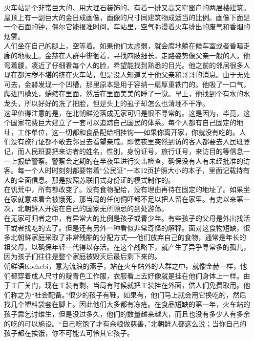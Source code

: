 火车站是个非常巨大的、用大理石装饰的、有着一排又高又窄窗户的两层楼建筑。屋顶上有一副巨大的金日成画像，画像的尺寸同建筑物成适当的比例。画像下面是一个石面的钟，偶尔它能报准时间。车站里，空气弥漫着火车排出的废气和香烟的烟雾。\\

人们坐在自己的腿上，空等着。如果他们太虚弱，就会席地躺在候车室或者昏暗走廊的地板上。金赫在人群中徘徊着，寻找四肢细长，走路姿势像父亲一般的人。他弯着腰，凑近了仔细看每个人的脸，希望能找到熟悉的目光。他之前的邻居很多人现在都污秽不堪的挤在火车站，但是没人知道关于他父亲和哥哥的消息。由于无处可去，金赫发现一个凹槽，那里原本是用于容纳一扇厚重铁门的。他吸了一口气，爬进凹槽处，蜷缩在里面，然后在里面美美的睡了一觉。早上，他找到个有水的水龙头，所以好好的洗了把脸，但是头上的虱子却怎么也清理不干净。\\

这里值得注意的是，在北朝鲜沦落成无家可归是很不寻常的。这是因为，毕竟，这个国家花费巨大建立了一套可以追踪自己国民的体系。每个人都有自己固定的地址，工作单位，这一切都和食品配给相挂钩──如果你离开家，你就没有吃的。人们没有旅行证都不敢去邻县去看望亲戚。即使夜里突然到访的客人都要去人民班登记，而人民班要把来访者的姓名，性别，身份证号，旅行证号，来访目的等信息一一上报给警察。警察会定期的在半夜里进行突击检查，确保没有人有未经批准的访客。每一个人时时刻刻都要带着“公民证”一本12页护照大小的本子，里面记载持有人的全面信息。那是按照苏联旧式身份证的模式制作的。\\

在饥荒中，所有都改变了。没有食物配给，没有理由再待在固定的地址了。如果坐在家就意味着会被饿死，那当局的任何恫吓都不足以把人留在家里。有史以来第一次，北朝鲜人开始在自己的国家无所顾忌的到处游荡。\\

在无家可归者之中，有异常大的比例是孩子或青少年。有些孩子的父母是外出找活干或者找吃的去了。但是还有另外一种看似非常奇怪的解释。面对这食物短缺，很多北朝鲜家庭采取了非常残酷的分配方式──他们放弃自己的食物，通常是年长的祖父母，以确保年轻一代得以存活。在这个战略下，就产生了异乎寻常多的孤儿，因为孩子们往往是整个家庭被毁灭后最后剩下来的。\\

朝鲜语Kochebi，意为流浪的燕子，站在火车站外的人群之中。就像金赫一样，他们都穿着成人尺寸的靛青色工作服，衣服看上去好像就是挂在他们身体上一样。由于工厂关门，现在工装有剩，当局有时候就把工装挂在外面，供人们免费取用。他们称之为“社会配备。”很少的孩子有鞋。如果有，他们马上就会用它换吃的，然后找几个塑料袋套在脚上。因此他们大多都有冻疮。在食品短缺的第一年，火车站的孩子靠乞讨维生，但是没过多久，他们的数量越来越大，而且也没有多少人有多余的吃的可以施设。“自己吃饱了才有余粮做慈善，”北朝鲜人都这么说；当你自己的孩子都在挨饿，你不可能去可怜其它孩子。\\


